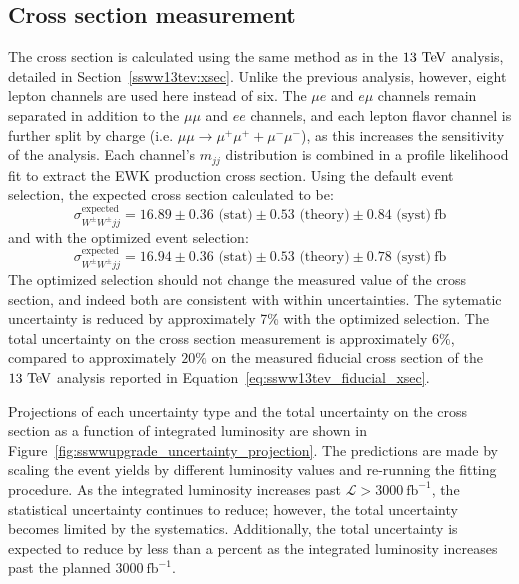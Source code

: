 \subsection{Cross section measurement}\label{sswwupgrade:results_xsec}

The cross section is calculated using the same method as in the $13\tev$ analysis, detailed in Section~\ref{ssww13tev:xsec}.
Unlike the previous analysis, however, eight lepton channels are used here instead of six.
The $\mu e$ and $e\mu$ channels remain separated in addition to the $\mu\mu$ and $ee$ channels, and each lepton flavor channel is further split by charge (i.e. $\mu\mu\rightarrow\mu^+\mu^++\mu^-\mu^-$), as this increases the sensitivity of the analysis.
Each channel's $m_{jj}$ distribution is combined in a profile likelihood fit to extract the EWK \ssww production cross section.
Using the default event selection, the expected cross section calculated to be:
\begin{equation}
  \sigma_{W^\pm W^\pm jj}^{\textrm{expected}} = 16.89 \pm 0.36 \textrm{\ (stat)} \pm 0.53 \textrm{\ (theory)} \pm 0.84 \textrm{\ (syst)}~\textrm{fb}
  \label{eq:sswwupgrade_xsec_default}
\end{equation}
and with the optimized event selection:
\begin{equation}
    \sigma_{W^\pm W^\pm jj}^{\textrm{expected}} = 16.94 \pm 0.36 \textrm{\ (stat)} \pm 0.53 \textrm{\ (theory)} \pm 0.78 \textrm{\ (syst)}~\textrm{fb}
  \label{eq:sswwupgrade_xsec_optimized}
\end{equation}
The optimized selection should not change the measured value of the cross section, and indeed both are consistent with within uncertainties.
The sytematic uncertainty is reduced by approximately 7\% with the optimized selection.
The total uncertainty on the cross section measurement is approximately $6\%$, compared to approximately $20\%$ on the measured fiducial cross section of the $13\tev$ analysis reported in Equation~\ref{eq:ssww13tev_fiducial_xsec}.

Projections of each uncertainty type and the total uncertainty on the cross section as a function of integrated luminosity are shown in Figure~\ref{fig:sswwupgrade_uncertainty_projection}.
The predictions are made by scaling the event yields by different luminosity values and re-running the fitting procedure.
As the integrated luminosity increases past $\mathcal{L} > 3000~\textrm{fb}^{-1}$, the statistical uncertainty continues to reduce; however, the total uncertainty becomes limited by the systematics.
Additionally, the total uncertainty is expected to reduce by less than a percent as the integrated luminosity increases past the planned $3000~\textrm{fb}^{-1}$.

